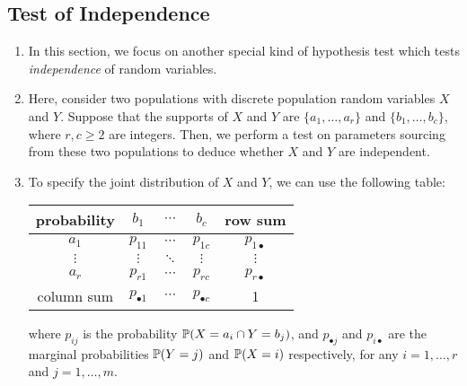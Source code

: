 \subsection{Test of Independence}
\begin{enumerate}
\item In this section, we focus on another special kind of hypothesis test
which tests \emph{independence} of random variables.

\item Here, consider two populations with discrete population random variables
\(X\) and \(Y\). Suppose that the supports of \(X\) and \(Y\) are
\(\{a_1,\dotsc,a_r\}\) and \(\{b_1,\dotsc,b_c\}\), where \(r,c\ge 2\) are
integers. Then, we perform a test on parameters sourcing from these two
populations to deduce whether \(X\) and \(Y\) are independent.

\item To specify the joint distribution of \(X\) and \(Y\), we can use the
following table:
\begin{center}
\begin{tabular}{c|ccc|c}
\toprule
probability&\(b_1\)&\(\cdots\)&\(b_c\)&row sum\\
\midrule
\(a_1\)&\(p_{11}\)&\(\cdots\)&\(p_{1c}\)&\(p_{1\bullet}\)\\
\(\vdots\)&\(\vdots\)&\(\ddots\)&\(\vdots\)&\(\vdots\)\\
\(a_r\)&\(p_{r1}\)&\(\cdots\)&\(p_{rc}\)&\(p_{r\bullet}\)\\
\midrule
column sum&\(p_{\bullet 1}\)&\(\cdots\)&\(p_{\bullet c}\)&1\\
\bottomrule
\end{tabular}
\end{center}
where \(p_{ij}\) is the probability \(\mathbb{P}\qty(X=a_i\cap Y=b_j)\), and
\(p_{\bullet j}\) and \(p_{i\bullet}\) are the marginal probabilities
\(\mathbb{P}\qty(Y=j)\) and \(\mathbb{P}\qty(X=i)\) respectively, for any \(i=1,\dotsc,r\) and
\(j=1,\dotsc,m\).


\end{enumerate}
